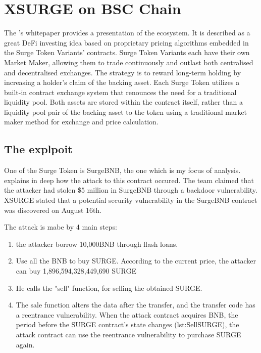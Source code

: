 \section{XSURGE on BSC Chain}   
\label{sec:Exploits:XSURGE}
The \citet{XSurgeWeb}'s whitepaper provides a presentation of the ecosystem.
It is described as a great DeFi investing idea based on proprietary pricing algorithms embedded in the Surge Token Variants' contracts.
Surge Token Variants each have their own Market Maker, allowing them to trade continuously and outlast both 
centralised and decentralised exchanges. 
The strategy is to reward long-term holding by increasing a
holder's claim of the backing asset. Each Surge Token utilizes a built-in contract exchange system that renounces the need for
a traditional liquidity pool. Both assets are stored within the contract itself, 
rather than a liquidity pool pair of the backing asset to the
token using a traditional market maker method for exchange and price calculation.

\subsection{The explpoit}
One of the Surge Token is SurgeBNB, the one which is my focus of analysis.
\citet{XSurgeBNB} explains in deep how the attack to this contract occured. 
The team claimed that the attacker had stolen \$5 million in SurgeBNB through a backdoor vulnerability.
XSURGE stated that a potential security vulnerability in the SurgeBNB contract was discovered on August 16th.

The attack is mabe by 4 main steps:
\begin{enumerate}
    \item the attacker borrow  10,000BNB through flash loans.
    \item Use all the BNB to buy SURGE. According to the current price, 
    the attacker can buy 1,896,594,328,449,690 SURGE
    \item He calls the "sell" function, for selling the obtained SURGE.
    \item The sale function alters the data after the transfer, and the transfer code has a reentrance vulnerability.
    When the attack contract acquires BNB, the period before the SURGE contract's state changes 
    (\refname{lst:SellSURGE}), the attack contract can use the reentrance 
    vulnerability to purchase SURGE again.
\end{enumerate}

